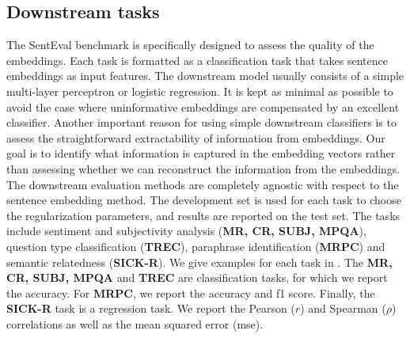 \subsection{Downstream tasks}

The SentEval benchmark \parencite{conneau_18} is specifically designed to assess the quality of the embeddings. Each task is formatted as a classification task that takes sentence embeddings as input features. The downstream model usually consists of a simple multi-layer perceptron or logistic regression. It is kept as minimal as possible to avoid the case where uninformative embeddings are compensated by an excellent classifier. Another important reason for using simple downstream classifiers is to assess the straightforward extractability of information from embeddings. Our goal is to identify what information is captured in the embedding vectors rather than assessing whether we can reconstruct the information from the embeddings. The downstream evaluation methods are completely agnostic with respect to the sentence embedding method. The development set is used for each task to choose the regularization parameters, and results are reported on the test set. The tasks include sentiment and subjectivity analysis (\textbf{MR, CR, SUBJ, MPQA}), question type classification (\textbf{TREC}), paraphrase identification (\textbf{MRPC}) and semantic relatedness (\textbf{SICK-R}). We give examples for each task in . The \textbf{MR, CR, SUBJ, MPQA} and \textbf{TREC} are classification tasks, for which we report the accuracy. For \textbf{MRPC}, we report the accuracy and f1 score. Finally, the \textbf{SICK-R} task is a regression task. We report the Pearson ($r$) and Spearman ($\rho$) correlations as well as the mean squared error (mse).

